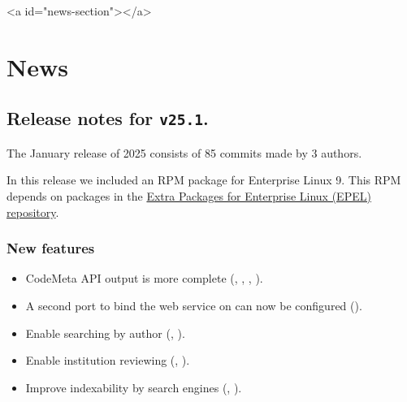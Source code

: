 \ifdefined\HCode
\begin{html}
<a id="news-section"></a>
\end{html}
\fi
\chapter*{News}

\section*{Release notes for \texttt{v25.1}.}

  The January release of 2025 consists of 85 commits made by 3 authors.

  In this release we included an RPM package for Enterprise Linux 9.  This RPM
  depends on packages in the \href{https://docs.fedoraproject.org/en-US/epel/}%
  {Extra Packages for Enterprise Linux (EPEL) repository}.

\subsection*{New features}
\begin{itemize}
  \item{CodeMeta API output is more complete
      (,
      ,
      ,
      ).}
  \item{A second port to bind the web service on can now be configured
      ().}
  \item{Enable searching by author (,
      ).}
  \item{Enable institution reviewing (,
      ).}
  \item{Improve indexability by search engines
      (,
      ).}
\end{itemize}
